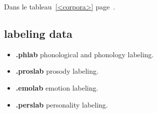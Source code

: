 Dans le tableau~\ref{<corpora>} page~\pageref{<corpora>}.

\subsection{labeling data}

\begin{itemize}
	\item \textbf{.phlab} phonological and phonology labeling.
	\item \textbf{.proslab} prosody labeling.
	\item \textbf{.emolab} emotion labeling.
	\item \textbf{.perslab} personality labeling.
\end{itemize}


 